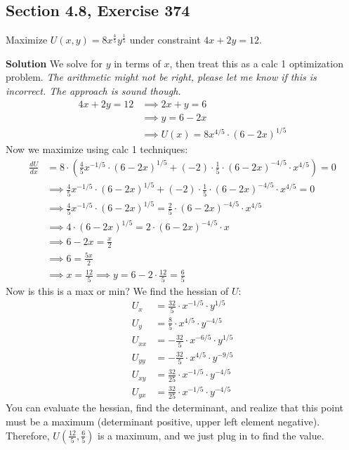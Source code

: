 \documentclass[]{mangos-musings}
\begin{document}
\subsection*{Section 4.8, Exercise 374}
Maximize $U(x, y) = 8x^{\frac{4}{5}} y^{\frac{1}{5}}$ under constraint $4x + 2y = 12$.

\textbf{Solution} We solve for $y$ in terms of $x$, then treat this as a calc 1 optimization problem.
\textit{The arithmetic might not be right, please let me know if this is incorrect. The approach is sound though.}
\begin{align*}
  4x + 2y = 12 & \implies 2x + y = 6
  \\ & \implies y = 6 - 2x 
  \\ & \implies U(x) = 8x^{4/5}\cdot (6 - 2x)^{1/5}
\end{align*}
Now we maximize using calc 1 techniques:
\begin{align*}
  \frac{dU}{dx} &= 8 \cdot\left( \frac{4}{5}x^{-1/5} \cdot (6 - 2x)^{1/5} + (-2)\cdot\frac{1}{5}\cdot(6-2x)^{-4/5}\cdot x^{4/5}\right) = 0
  \\ &\implies \frac{4}{5}x^{-1/5} \cdot (6 - 2x)^{1/5} + (-2)\cdot\frac{1}{5}\cdot(6-2x)^{-4/5}\cdot x^{4/5} = 0
  \\ &\implies \frac{4}{5}x^{-1/5} \cdot (6 - 2x)^{1/5}  = \frac{2}{5}\cdot (6-2x)^{-4/5}\cdot x^{4/5}
  \\ &\implies 4\cdot(6-2x)^{1/5} = 2\cdot(6-2x)^{-4/5}\cdot x
  \\ &\implies 6-2x = \frac{x}{2}
  \\ &\implies 6 = \frac{5x}{2}
  \\ &\implies x = \frac{12}{5} \implies y = 6 - 2\cdot \frac{12}{5} = \frac{6}{5}
\end{align*}
Now is this is a max or min? We find the hessian of $U$:
\begin{align*}
  U_x &= \frac{32}{5}\cdot x^{-1/5}\cdot y^{1/5}\\
  U_y &= \frac{8}{5}\cdot x^{4/5}\cdot y^{-4/5}\\
  U_{xx} &= -\frac{32}{5}\cdot x^{-6/5}\cdot y^{1/5}\\ 
  U_{yy} &= -\frac{32}{5}\cdot x^{4/5}\cdot y^{-9/5}\\ 
  U_{xy} &= \frac{32}{25}\cdot x^{-1/5}\cdot y^{-4/5}\\
  U_{yx} &= \frac{32}{25}\cdot x^{-1/5}\cdot y^{-4/5} \tag{Clairaut's}
\end{align*}
You can evaluate the hessian, find the determinant, and realize that this point must be a maximum (determinant positive, upper left element negative). 
Therefore, $U\left(\frac{12}{5}, \frac{6}{5}\right)$ is a maximum, and we just plug in to find the value.
\end{document}
